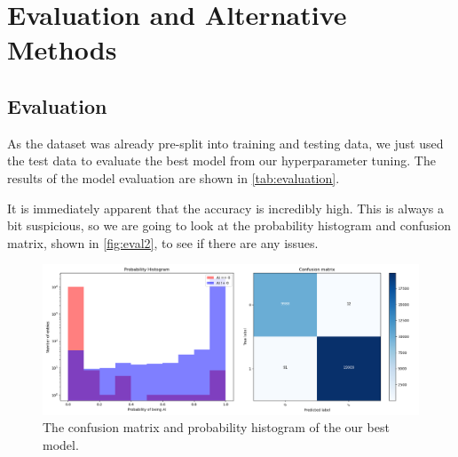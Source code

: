 \chapter{Evaluation and Alternative Methods}

\section{Evaluation}
\label{sec:evaluation}

As the dataset was already pre-split into training and testing data, we just used the test data to evaluate the best model from our hyperparameter tuning.
The results of the model evaluation are shown in \autoref{tab:evaluation}.

\begin{table}[H]
    \centering
    \caption{Evaluation results for model built on top of the frozen \texttt{VGG16} base.}
    \label{tab:evaluation}
    \end{table}


It is immediately apparent that the accuracy is incredibly high.
This is always a bit suspicious, so we are going to look at the probability histogram and confusion matrix, shown in \autoref{fig:eval2}, to see if there are any issues.

\begin{figure}[H]
    \centering
    \includegraphics[width=1\textwidth]{images/confusion_matrix_and_histogram.png}
    \caption{The confusion matrix and probability histogram of the our best model.}
    \label{fig:eval2}
\end{figure}

